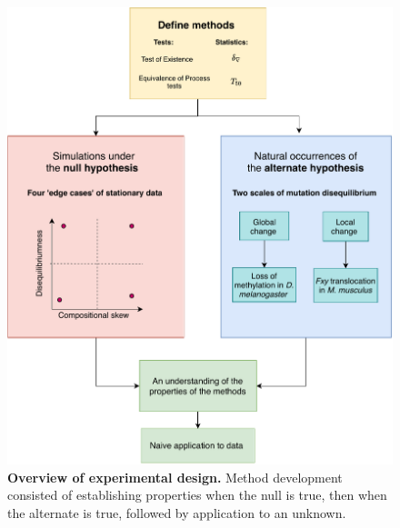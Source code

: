 \begin{figure}[htbp]
\centering
\includegraphics[width=\textwidth]{figures/diagrams/experimental_design.pdf}
\caption[Overview of experimental design]{\textbf{Overview of experimental design.} Method development consisted of establishing properties when the null is true, then when the alternate is true, followed by application to an unknown.}
\label{fig:experimental_design}
\end{figure}